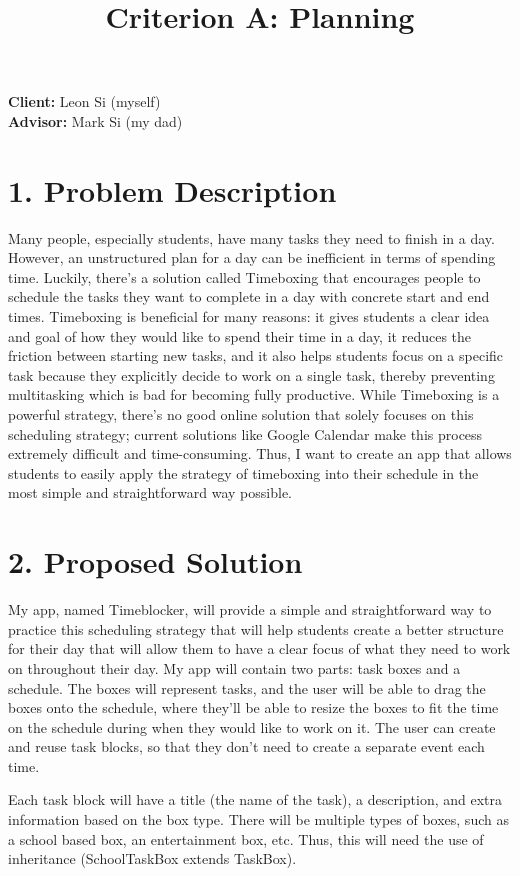 \documentclass[12pt, notitlepage]{report}
\title{Criterion A: Planning}
\begin{document}
\centerline{\textcolor{msblue}{
		\textbf{\fontsize{13}{13}\@title}
	}}

\noindent\textbf{Client:} Leon Si (myself)
\\
\textbf{Advisor:} Mark Si (my dad)

\section*{1. Problem Description}
Many people, especially students, have many tasks they need to finish in a day.
However, an unstructured plan for a day can be inefficient in terms of spending time.
Luckily, there's a solution called Timeboxing that encourages people to schedule the tasks they want to complete in a day with concrete start and end times.
Timeboxing is beneficial for many reasons: it gives students a clear idea and goal of how they would like to spend their time in a day, it reduces the friction between starting new tasks, and it also helps students focus on a specific task because they explicitly decide to work on a single task, thereby preventing multitasking which is bad for becoming fully productive.
While Timeboxing is a powerful strategy, there's no good online solution that solely focuses on this scheduling strategy; current solutions like Google Calendar make this process extremely difficult and time-consuming.
Thus, I want to create an app that allows students to easily apply the strategy of timeboxing into their schedule in the most simple and straightforward way possible.

\section*{2. Proposed Solution}
My app, named Timeblocker, will provide a simple and straightforward way to practice this scheduling strategy that will help students create a better structure for their day that will allow them to have a clear focus of what they need to work on throughout their day.
My app will contain two parts: task boxes and a schedule.
The boxes will represent tasks, and the user will be able to drag the boxes onto the schedule, where they'll be able to resize the boxes to fit the time on the schedule during when they would like to work on it.
The user can create and reuse task blocks, so that they don't need to create a separate event each time.

Each task block will have a title (the name of the task), a description, and extra information based on the box type.
There will be multiple types of boxes, such as a school based box, an entertainment box, etc.
Thus, this will need the use of inheritance (SchoolTaskBox extends TaskBox).
\end{document}
